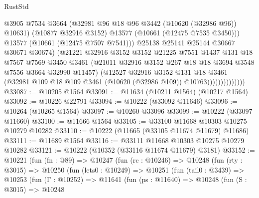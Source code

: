 \begin{lexlean}{RustStd}
\begin{coremodule}
                                @3905
                                @7534
                                @3664
                                (@32981 @96 @18 @96 @3442 (@10620 (@32986 @96)) @10631)
                                (@10877 @32916 @3152)
                                @13577
                                (@10661 (@12475 @7535 @3450)))
                              @13577
                              (@10661 (@12475 @7507 @7541)))
                            @25138
                            @25141
                            @25144
                            @30667
                            @30671
                            @30674)
                          (@21221
                            @32916
                            @3152
                            @3152
                            @21225
                            @7551
                            @1437
                            @131
                            @18
                            @7567
                            @7569
                            @3450
                            @3461
                            (@21011 @32916 @3152 @267 @18 @18 @3694 @3548 @7556 @3664 @32990 @11457)
                            (@12527
                              @32916
                              @3152
                              @131
                              @18
                              @3461
                              (@32981
                                @109
                                @18
                                @109
                                @3461
                                (@10620 (@32986 @109))
                                @10763))))))))))))))
@33087 := @10205 @1564
@33091 := @11634 (@10211 @1564) (@10217 @1564)
@33092 := @10226 @22791
@33094 := @10222 (@33092 @11646)
@33096 := @10264 (@10265 @1564)
@33097 := @10260 @33096
@33099 := @10222 (@33097 @11660)
@33100 := @11666 @1564
@33105 := @33100 @11668 @10303 @10275 @10279 @10282
@33110 := @10222 (@11665 (@33105 @11674 @11679) @11686)
@33111 := @11689 @1564
@33116 := @33111 @11668 @10303 @10275 @10279 @10282
@33121 := @10222 (@10352 (@33116 @11674 @11679) @3181)
@33152 := @10221
    (fun (fn : @89) =>
    @10247
      (fun (rc : @10246) =>
      @10248
        (fun (rty : @3015) =>
        @10250
          (fun (lets0 : @10249) =>
          @10251
            (fun (tail0 : @3439) =>
            @10253
              (fun (Γ : @10252) =>
              @11641
                (fun (ps : @11640) =>
                @10248
                  (fun (S : @3015) =>
                  @10248

\end{coremodule}
\end{lexlean}
